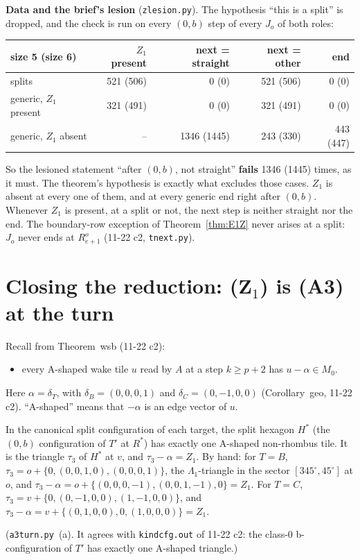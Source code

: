 \documentclass[11pt]{article}
\theoremstyle{definition}\newtheorem{definition}[theorem]{Definition}\newtheorem{remark}[theorem]{Remark}
\begin{document}
\noindent\textbf{Data and the brief's lesion} (\texttt{zlesion.py}). The hypothesis ``this is a split'' is dropped, and the check is run on every $(0,b)$ step of every $J_o$ of both roles:
\begin{center}\small\begin{tabular}{lrrrr}\toprule
size 5 (size 6) & $Z_1$ present & next = straight & next = other & end\\\midrule
splits & 521 (506) & 0 (0) & 521 (506) & 0 (0)\\
generic, $Z_1$ present & 321 (491) & 0 (0) & 321 (491) & 0 (0)\\
generic, $Z_1$ absent & -- & 1346 (1445) & 243 (330) & 443 (447)\\\bottomrule
\end{tabular}\end{center}
So the lesioned statement ``after $(0,b)$, not straight'' \textbf{fails} 1346 (1445) times, as it must. The theorem's hypothesis is exactly what excludes those cases. $Z_1$ is absent at every one of them, and at every generic end right after $(0,b)$. Whenever $Z_1$ is present, at a split or not, the next step is neither straight nor the end. The boundary-row exception of Theorem~\ref{thm:E1Z} never arises at a split: $J_o$ never ends at $R^o_{e+1}$ (11-22 c2, \texttt{tnext.py}).


\section{Closing the reduction: (Z$_1$) is (A3) at the turn}\label{sec:A3}
Recall from Theorem~wsb (11-22 c2):
\begin{itemize}
\item[\textbf{(A3)}] every A-shaped wake tile $u$ read by $A$ at a step $k\ge p+2$ has $u-\alpha\in M_0$.
\end{itemize}
Here $\alpha=\delta_T$, with $\delta_B=(0,0,0,1)$ and $\delta_C=(0,-1,0,0)$ (Corollary~geo, 11-22 c2). ``A-shaped'' means that $-\alpha$ is an edge vector of $u$.
\begin{lemma}\label{lem:turn}
In the canonical split configuration of each target, the split hexagon $H^\ast$ (the $(0,b)$ configuration of $T'$ at $R^\ast$) has exactly one A-shaped non-rhombus tile. It is the triangle $\tau_3$ of $H^\ast$ at $v$, and $\tau_3-\alpha=Z_1$. By hand: for $T=B$, $\tau_3=o+\{0,(0,0,1,0),(0,0,0,1)\}$, the $\Lambda_1$-triangle in the sector $[345^\circ,45^\circ]$ at $o$, and $\tau_3-\alpha=o+\{(0,0,0,-1),(0,0,1,-1),0\}=Z_1$. For $T=C$, $\tau_3=v+\{0,(0,-1,0,0),(1,-1,0,0)\}$, and $\tau_3-\alpha=v+\{(0,1,0,0),0,(1,0,0,0)\}=Z_1$.
\end{lemma}
\noindent (\texttt{a3turn.py}~(a). It agrees with \texttt{kindcfg.out} of 11-22 c2: the class-0 b-configuration of $T'$ has exactly one A-shaped triangle.)
\end{document}
